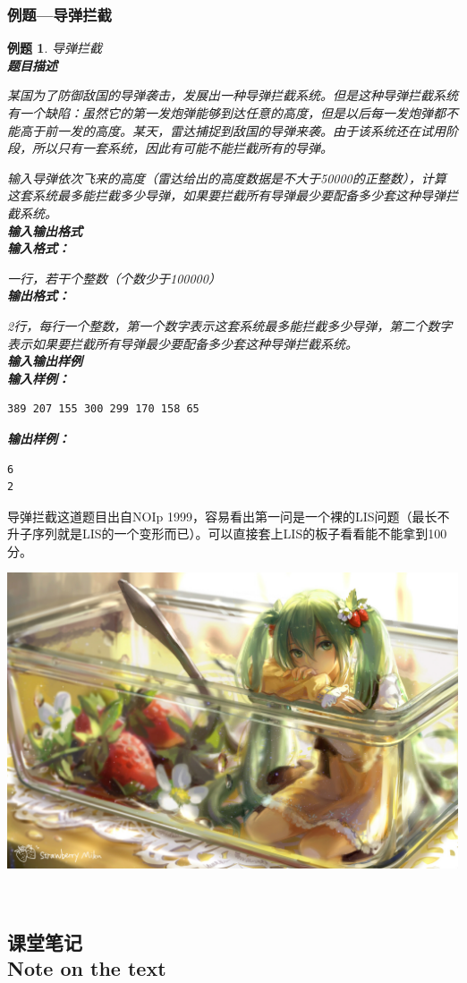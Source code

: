 \documentclass{article}
\newtheorem{example}{例题}[subsection]
\theoremstyle{nonumberplain}
\newcommand{\note}{\ \par
	\subsection*{课堂笔记\\\tiny{Note on the text}}
	\newpage}
\begin{document}
\subsubsection{例题---导弹拦截}
\begin{example}导弹拦截\\
	\textbf{题目描述}

	某国为了防御敌国的导弹袭击，发展出一种导弹拦截系统。但是这种导弹拦截系统有一个缺陷：虽然它的第一发炮弹能够到达任意的高度，但是以后每一发炮弹都不能高于前一发的高度。某天，雷达捕捉到敌国的导弹来袭。由于该系统还在试用阶段，所以只有一套系统，因此有可能不能拦截所有的导弹。

	输入导弹依次飞来的高度（雷达给出的高度数据是不大于50000的正整数），计算这套系统最多能拦截多少导弹，如果要拦截所有导弹最少要配备多少套这种导弹拦截系统。\\
	\textbf{输入输出格式}
	\ \\
	\textbf{输入格式：}

	一行，若干个整数（个数少于100000）
	\ \\
	\textbf{输出格式：}

	2行，每行一个整数，第一个数字表示这套系统最多能拦截多少导弹，第二个数字表示如果要拦截所有导弹最少要配备多少套这种导弹拦截系统。
	\ \\
	\textbf{输入输出样例}
	\ \\
	\textbf{输入样例：}
	\begin{verbatim}
389 207 155 300 299 170 158 65
\end{verbatim}
	\textbf{输出样例：}
	\begin{verbatim}
6
2
\end{verbatim}
\end{example}

导弹拦截这道题目出自NOIp 1999，容易看出第一问是一个裸的LIS问题（最长不升子序列就是LIS的一个变形而已）。可以直接套上LIS的板子看看能不能拿到100分。

\begin{center}\includegraphics[scale=0.80]{43749408_p0.jpg}\end{center}
\note
\end{document}
